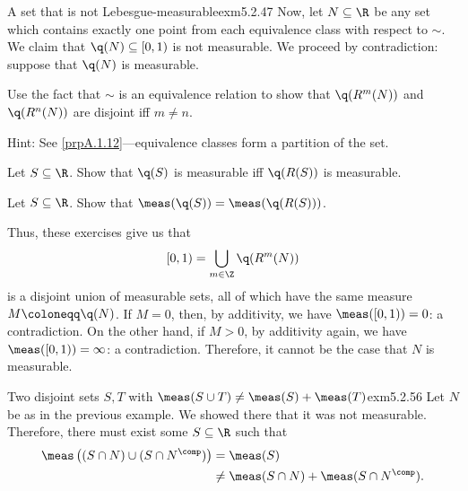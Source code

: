 \begin{exm}{A set that is not Lebesgue-measurable}{exm5.2.47}
Now, let $N\subseteq \R$ be any set which contains exactly one point from each equivalence class with respect to $\sim$.  We claim that $\q (N)\subseteq [0,1)$ is not measurable.  We proceed by contradiction:  suppose that $\q (N)$ is measurable.
\begin{exr}[breakable=false]{}{}
Use the fact that $\sim$ is an equivalence relation to show that $\q (R^m(N))$ and $\q (R^n(N))$ are disjoint iff $m\neq n$.
\begin{rmk}
Hint:  See \cref{prpA.1.12}---equivalence classes form a partition of the set.
\end{rmk}
\end{exr}
\begin{exr}[breakable=false]{}{}
Show that
\begin{equation}
[0,1)=\bigcup _{m\in \Z}\q (R^m(N))
\end{equation}
\begin{rmk}
Hint:  Once again, uses the fact that equivalence classes form a partition.
\end{rmk}
\end{exr}
\begin{exr}[breakable=false]{}{}
Let $S\subseteq \R$.  Show that $\q (S)$ is measurable iff $\q (R(S))$ is measurable.
\end{exr}
\begin{exr}[breakable=false]{}{}
Let $S\subseteq \R$.  Show that $\meas (\q (S))=\meas (\q (R(S)))$.
\end{exr}
Thus, these exercises give us that
\begin{equation}
[0,1)=\bigcup _{m\in \Z}\q (R^m(N))
\end{equation}
is a disjoint union of measurable sets, all of which have the same measure $M\coloneqq \q (N)$.  If $M=0$, then, by additivity, we have $\meas ([0,1))=0$:  a contradiction.  On the other hand, if $M>0$, by additivity again, we have $\meas ([0,1))=\infty$:  a contradiction.  Therefore, it cannot be the case that $N$ is measurable.
\end{exm}
\begin{exm}{Two disjoint sets $S,T$ with $\meas (S\cup T)\neq \meas (S)+\meas (T)$}{exm5.2.56}
Let $N$ be as in the previous example.  We showed there that it was not measurable.  Therefore, there must exist some $S\subseteq \R$ such that
\begin{equation}
\begin{split}
\meas \left( (S\cap N)\cup (S\cap N^{\comp})\right) & =\meas (S) \\
& \neq \meas (S\cap N)+\meas (S\cap N^{\comp}).
\end{split}
\end{equation}
\end{exm}
